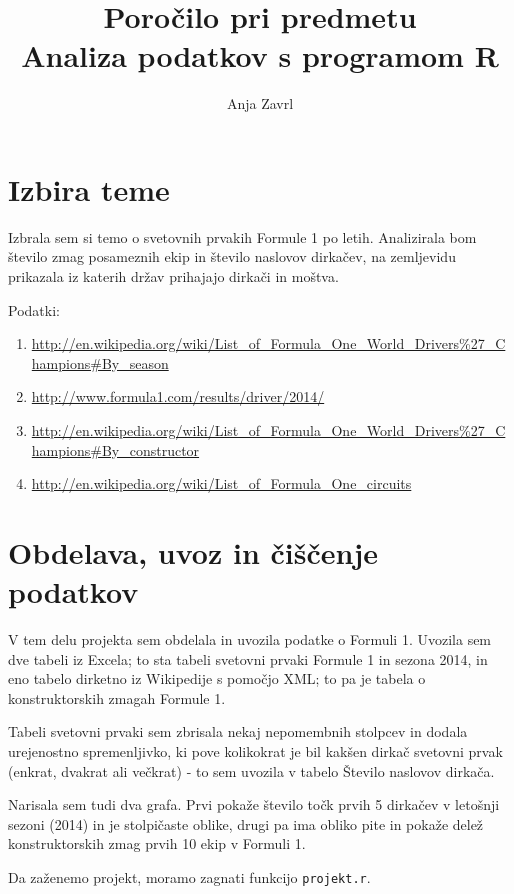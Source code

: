\documentclass[11pt,a4paper]{article}
\begin{document}
\title{Poročilo pri predmetu \\
Analiza podatkov s programom R}
\author{Anja Zavrl}
\maketitle

\section{Izbira teme}

Izbrala sem si temo o svetovnih prvakih Formule 1 po letih. Analizirala bom število zmag posameznih ekip in število naslovov dirkačev, na zemljevidu prikazala iz katerih držav prihajajo dirkači in moštva.

Podatki: 
\begin{enumerate}
\item \url{http://en.wikipedia.org/wiki/List_of_Formula_One_World_Drivers%27_Champions#By_season}
\item \url{http://www.formula1.com/results/driver/2014/}
\item \url{http://en.wikipedia.org/wiki/List_of_Formula_One_World_Drivers%27_Champions#By_constructor}
\item \url{http://en.wikipedia.org/wiki/List_of_Formula_One_circuits}
\end{enumerate}

\section{Obdelava, uvoz in čiščenje podatkov}

V tem delu projekta sem obdelala in uvozila podatke o Formuli 1. Uvozila sem dve tabeli iz Excela; to sta tabeli
svetovni prvaki Formule 1 in sezona 2014, in eno tabelo dirketno iz Wikipedije s pomočjo XML; to pa je tabela o konstruktorskih zmagah Formule 1. 

Tabeli svetovni prvaki sem zbrisala nekaj nepomembnih stolpcev in dodala urejenostno spremenljivko, ki pove kolikokrat je bil kakšen dirkač svetovni prvak (enkrat, dvakrat ali večkrat) - to sem uvozila v tabelo Število naslovov dirkača.

Narisala sem tudi dva grafa. Prvi pokaže število točk prvih 5 dirkačev v letošnji sezoni (2014) in je stolpičaste oblike, drugi pa ima obliko pite in pokaže delež konstruktorskih zmag prvih 10 ekip v Formuli 1.

Da zaženemo projekt, moramo zagnati funkcijo \verb|projekt.r|.
\end{document}
